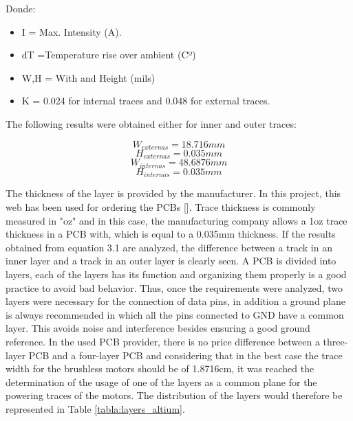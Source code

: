 Donde: 
\begin{itemize}
	\item I = Max. Intensity (A).
	\item dT =Temperature rise over ambient (Cº)
	\item W,H = With and Height (mils)
	\item K = 0.024 for internal traces and 0.048 for external traces.
\end{itemize}

The following results were obtained either for inner and outer traces:

\begin{equation*}
W_{externas} = 18.716 mm 
\end{equation*} 
\begin{equation*}
H_{externas} = 	0.035 mm
\end{equation*}
\begin{equation*}
W_{internas} =  48.6876 mm 
\end{equation*} 
\begin{equation*}
H_{internas} = 	0.035 mm
\end{equation*}

The thickness of the layer is provided by the manufacturer. In this project, this web has been used for ordering the PCBs []. \newline 
Trace thickness is commonly measured in "oz" and in this case, the manufacturing company allows a 1oz trace thickness in a PCB with, which is equal to a 0.035mm thickness.\newline
If the results obtained from equation 3.1 are analyzed, the difference between a track in an inner layer and a track in an outer layer is clearly seen.\newline
A PCB is divided into layers, each of the layers has its function and organizing them properly is a good practice to avoid bad behavior. Thus, once the requirements were analyzed, two layers were necessary for the connection of data pins, in addition a ground plane is always recommended in which all the pins connected to GND have a common layer. This avoids noise and interference besides ensuring a good ground reference. \newline
In the used PCB provider, there is no price difference between a three-layer PCB and a four-layer PCB and considering that in the best case the trace width for the brushless motors should be of 1.8716cm, it was reached the determination of the usage of one of the layers as a common plane for the powering traces of the motors. The distribution of the layers would therefore be represented in Table \ref{tabla:layers_altium}.

